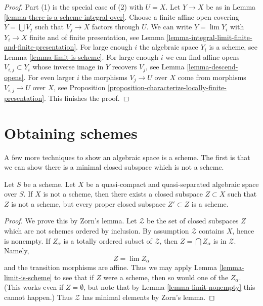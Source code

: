 \begin{proof}
Part (1) is the special case of (2) with $U = X$.
Let $Y \to X$ be as in Lemma \ref{lemma-there-is-a-scheme-integral-over}.
Choose a finite affine open covering $Y = \bigcup V_j$ such that $V_j \to X$
factors through $U$. We can write $Y = \lim Y_i$ with
$Y_i \to X$ finite and of finite presentation, see
Lemma \ref{lemma-integral-limit-finite-and-finite-presentation}.
For large enough $i$ the algebraic space $Y_i$ is a scheme, see
Lemma \ref{lemma-limit-is-scheme}.
For large enough $i$ we can find affine opens $V_{i, j} \subset Y_i$
whose inverse image in $Y$ recovers $V_j$, see
Lemma \ref{lemma-descend-opens}.
For even larger $i$ the morphisms $V_j \to U$ over $X$ come
from morphisms $V_{i, j} \to U$ over $X$, see Proposition
\ref{proposition-characterize-locally-finite-presentation}.
This finishes the proof.
\end{proof}



\section{Obtaining schemes}
\label{section-representable}

\noindent
A few more techniques to show an algebraic space is a scheme.
The first is that we can show there is a minimal closed subspace
which is not a scheme.

\begin{lemma}
\label{lemma-minimal-closed-subspace}
Let $S$ be a scheme. Let $X$ be a quasi-compact and quasi-separated
algebraic space over $S$. If $X$ is not a scheme, then there exists
a closed subspace $Z \subset X$ such that $Z$ is not a scheme, but
every proper closed subspace $Z' \subset Z$ is a scheme.
\end{lemma}

\begin{proof}
We prove this by Zorn's lemma. Let $\mathcal{Z}$ be the set
of closed subspaces $Z$ which are not schemes ordered by inclusion.
By assumption $\mathcal{Z}$ contains $X$, hence is nonempty.
If $Z_\alpha$ is a totally ordered subset of $\mathcal{Z}$, then
$Z = \bigcap Z_\alpha$ is in $\mathcal{Z}$. Namely,
$$
Z = \lim Z_\alpha
$$
and the transition morphisms are affine.
Thus we may apply Lemma \ref{lemma-limit-is-scheme} to see that if $Z$
were a scheme, then so would one of the $Z_\alpha$.
(This works even if $Z = \emptyset$, but note that by
Lemma \ref{lemma-limit-nonempty} this cannot happen.)
Thus $\mathcal{Z}$ has minimal elements by Zorn's lemma.
\end{proof}

